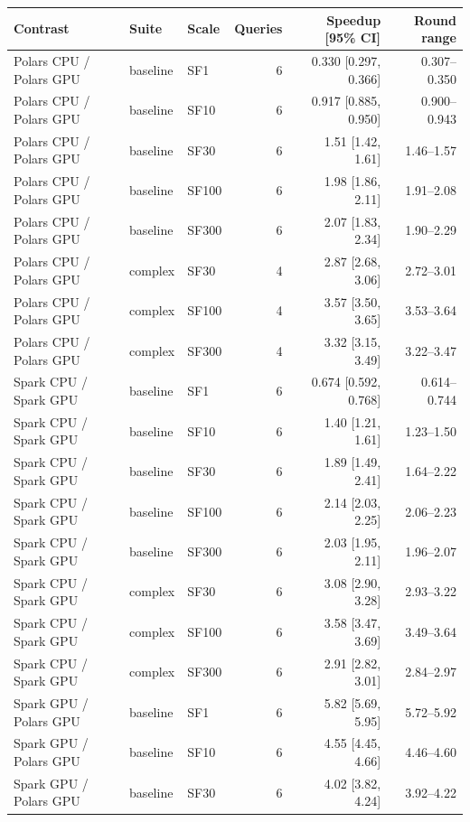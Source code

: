\begin{tabular}{lllrrr}
\toprule
Contrast & Suite & Scale & Queries & Speedup [95\% CI] & Round range \\
\midrule
Polars CPU / Polars GPU & baseline & SF1 & 6 & 0.330 [0.297, 0.366] & 0.307--0.350 \\
Polars CPU / Polars GPU & baseline & SF10 & 6 & 0.917 [0.885, 0.950] & 0.900--0.943 \\
Polars CPU / Polars GPU & baseline & SF30 & 6 & 1.51 [1.42, 1.61] & 1.46--1.57 \\
Polars CPU / Polars GPU & baseline & SF100 & 6 & 1.98 [1.86, 2.11] & 1.91--2.08 \\
Polars CPU / Polars GPU & baseline & SF300 & 6 & 2.07 [1.83, 2.34] & 1.90--2.29 \\
Polars CPU / Polars GPU & complex & SF30 & 4 & 2.87 [2.68, 3.06] & 2.72--3.01 \\
Polars CPU / Polars GPU & complex & SF100 & 4 & 3.57 [3.50, 3.65] & 3.53--3.64 \\
Polars CPU / Polars GPU & complex & SF300 & 4 & 3.32 [3.15, 3.49] & 3.22--3.47 \\
Spark CPU / Spark GPU & baseline & SF1 & 6 & 0.674 [0.592, 0.768] & 0.614--0.744 \\
Spark CPU / Spark GPU & baseline & SF10 & 6 & 1.40 [1.21, 1.61] & 1.23--1.50 \\
Spark CPU / Spark GPU & baseline & SF30 & 6 & 1.89 [1.49, 2.41] & 1.64--2.22 \\
Spark CPU / Spark GPU & baseline & SF100 & 6 & 2.14 [2.03, 2.25] & 2.06--2.23 \\
Spark CPU / Spark GPU & baseline & SF300 & 6 & 2.03 [1.95, 2.11] & 1.96--2.07 \\
Spark CPU / Spark GPU & complex & SF30 & 6 & 3.08 [2.90, 3.28] & 2.93--3.22 \\
Spark CPU / Spark GPU & complex & SF100 & 6 & 3.58 [3.47, 3.69] & 3.49--3.64 \\
Spark CPU / Spark GPU & complex & SF300 & 6 & 2.91 [2.82, 3.01] & 2.84--2.97 \\
Spark GPU / Polars GPU & baseline & SF1 & 6 & 5.82 [5.69, 5.95] & 5.72--5.92 \\
Spark GPU / Polars GPU & baseline & SF10 & 6 & 4.55 [4.45, 4.66] & 4.46--4.60 \\
Spark GPU / Polars GPU & baseline & SF30 & 6 & 4.02 [3.82, 4.24] & 3.92--4.22 \\

\end{tabular}
